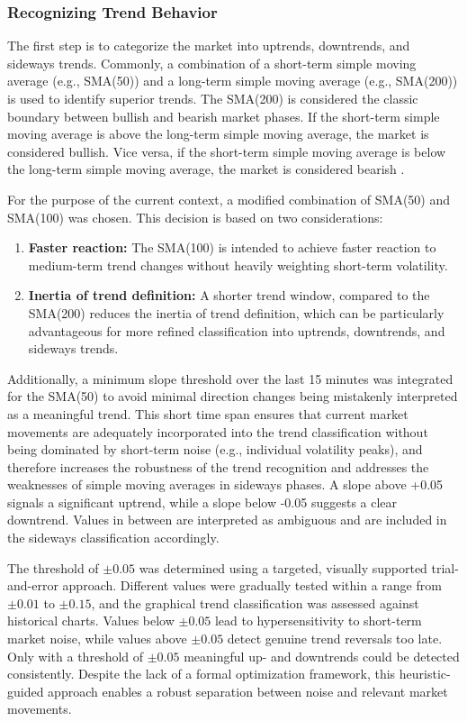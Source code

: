 \subsubsection{Recognizing Trend Behavior}
\label{chap:recognizing-trend}

The first step is to categorize the market into uptrends, downtrends, and sideways trends.
Commonly, a combination of a short-term simple moving average (e.g., SMA(50)) and a long-term simple moving average (e.g., SMA(200)) is used to identify superior trends.
The SMA(200) is considered the classic boundary between bullish and bearish market phases.
If the short-term simple moving average is above the long-term simple moving average, the market is considered bullish.
Vice versa, if the short-term simple moving average is below the long-term simple moving average, the market is considered bearish \cite{ig-regimes-mas}.

For the purpose of the current context, a modified combination of SMA(50) and SMA(100) was chosen.
This decision is based on two considerations:

\begin{enumerate}
    \item \textbf{Faster reaction:} The SMA(100) is intended to achieve faster reaction to medium-term trend changes without heavily weighting short-term volatility.
    \item \textbf{Inertia of trend definition:} A shorter trend window, compared to the SMA(200) reduces the inertia of trend definition, which can be particularly advantageous for more refined classification into uptrends, downtrends, and sideways trends.
\end{enumerate}

\noindent
Additionally, a minimum slope threshold over the last 15 minutes was integrated for the SMA(50) to avoid minimal direction changes being mistakenly interpreted as a meaningful trend.
This short time span ensures that current market movements are adequately incorporated into the trend classification without being dominated by short-term noise (e.g., individual volatility peaks), and therefore increases the robustness of the trend recognition and addresses the weaknesses of simple moving averages in sideways phases.
A slope above +0.05 signals a significant uptrend, while a slope below -0.05 suggests a clear downtrend.
Values in between are interpreted as ambiguous and are included in the sideways classification accordingly.

The threshold of $\pm 0.05$ was determined using a targeted, visually supported trial-and-error approach.
Different values were gradually tested within a range from $\pm 0.01$ to $\pm 0.15$, and the graphical trend classification was assessed against historical charts.
Values below $\pm 0.05$ lead to hypersensitivity to short-term market noise, while values above $\pm 0.05$ detect genuine trend reversals too late.
Only with a threshold of $\pm 0.05$ meaningful up- and downtrends could be detected consistently.
Despite the lack of a formal optimization framework, this heuristic-guided approach enables a robust separation between noise and relevant market movements.

